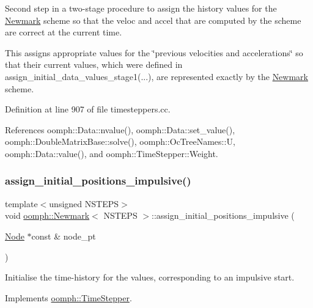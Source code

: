 Second step in a two-\/stage procedure to assign the history values for the \hyperlink{classoomph_1_1Newmark}{Newmark} scheme so that the veloc and accel that are computed by the scheme are correct at the current time. 

This assigns appropriate values for the \char`\"{}previous 
velocities and accelerations\char`\"{} so that their current values, which were defined in assign\+\_\+initial\+\_\+data\+\_\+values\+\_\+stage1(...), are represented exactly by the \hyperlink{classoomph_1_1Newmark}{Newmark} scheme. 

Definition at line 907 of file timesteppers.\+cc.



References oomph\+::\+Data\+::nvalue(), oomph\+::\+Data\+::set\+\_\+value(), oomph\+::\+Double\+Matrix\+Base\+::solve(), oomph\+::\+Oc\+Tree\+Names\+::U, oomph\+::\+Data\+::value(), and oomph\+::\+Time\+Stepper\+::\+Weight.

\mbox{\label{classoomph_1_1Newmark_a8b058a0cc65b0f24a119d5d9120952a2}} 
\subsubsection{\texorpdfstring{assign\+\_\+initial\+\_\+positions\+\_\+impulsive()}{assign\_initial\_positions\_impulsive()}}
{\footnotesize\ttfamily template$<$unsigned N\+S\+T\+E\+PS$>$ \\
void \hyperlink{classoomph_1_1Newmark}{oomph\+::\+Newmark}$<$ N\+S\+T\+E\+PS $>$\+::assign\+\_\+initial\+\_\+positions\+\_\+impulsive (\begin{DoxyParamCaption}\item[{\hyperlink{classoomph_1_1Node}{Node} $\ast$const \&}]{node\+\_\+pt }\end{DoxyParamCaption})\hspace{0.3cm}{\ttfamily [virtual]}}



Initialise the time-\/history for the values, corresponding to an impulsive start. 



Implements \hyperlink{classoomph_1_1TimeStepper_ab66972f0eaf3ba34645793e23e46afd5}{oomph\+::\+Time\+Stepper}.




